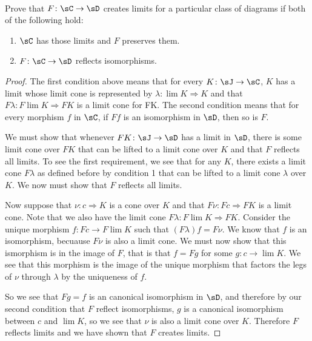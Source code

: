 \documentclass[../../main]{subfiles}
\begin{document}
\paragraph{}
\begin{exercise}
Prove that $F\colon\sC \rightarrow \sD$ creates limits for a particular class of diagrams if both of the following hold:
\begin{enumerate}
    \item $\sC$ has those limits and $F$ preserves them.
    \item $F\colon \sC \rightarrow \sD$ reflects isomorphisms.
\end{enumerate}
\end{exercise}

\begin{proof}
The first condition above means that for every $K\colon \sJ \rightarrow \sC$, $K$ has a
limit whose limit cone is represented by $\lambda\colon\lim K \Rightarrow K$ and
that $F\lambda\colon F\lim K \Rightarrow FK$ is a limit cone for FK. The second
condition means that for every morphism $f$ in $\sC$, if $Ff$ is an isomorphism
in $\sD$, then so is $F$.

We must show that whenever $FK\colon \sJ \rightarrow \sD$ has a limit in $\sD$, there is
some limit cone over $FK$ that can be lifted to a limit cone over $K$ and that
$F$ reflects all limits. To see the first requirement, we see that for any $K$,
there exists a limit cone $F\lambda$ as defined before by condition 1 that can
be lifted to a limit cone $\lambda$ over $K$. We now must show that $F$
reflects all limits.

Now suppose that $\nu\colon c \Rightarrow K$ is a cone over $K$ and that $F\nu\colon Fc
\Rightarrow FK$ is a limit cone. Note that we also have the limit cone
$F\lambda\colon F\lim K \Rightarrow FK$. Consider the unique morphism $f:Fc
\rightarrow F\lim K$ such that $(F\lambda)f=F\nu$. We know that $f$ is an
isomorphism, becuause $F\nu$ is also a limit cone.  We must now show that this
ismorphism is in the image of $F$, that is that $f = Fg$ for some $g: c
\rightarrow \lim K$. We see that this morphism is the image of the unique
morphism that factors the legs of $\nu$ through $\lambda$ by the uniqueness of
$f$.

So we see that $Fg = f$ is an canonical isomorphism in $\sD$, and therefore by
our second condition that $F$ reflect isomorphisms, $g$ is a canonical
isomorphism between $c$ and $\lim K$, so we see that $\nu$ is also a limit cone
over $K$. Therefore $F$ reflects limits and we have shown that $F$ creates
limits.
\end{proof}
\end{document}
